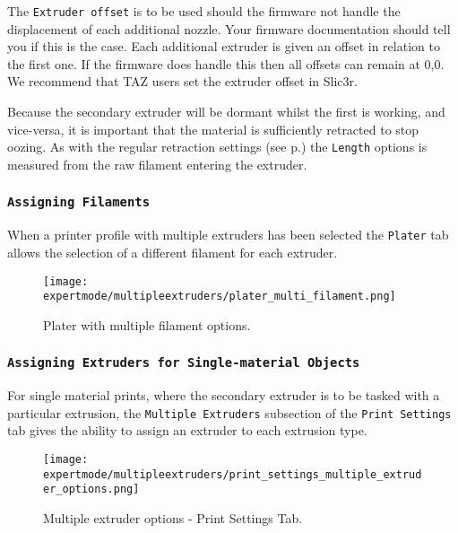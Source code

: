 
The \texttt{Extruder offset} is to be used should the firmware not handle the displacement of each additional nozzle.  Your firmware documentation should tell you if this is the case.  Each additional extruder is given an offset in relation to the first one.  If the firmware does handle this then all offsets can remain at 0,0. We recommend that TAZ users set the extruder offset in Slic3r.

Because the secondary extruder will be dormant whilst the first is working, and vice-versa, it is important that the material is sufficiently retracted to stop oozing.  As with the regular retraction settings (see p.\pageref{fig:retraction_settings}) the \texttt{Length} options is measured from the raw filament entering the extruder.


\subsubsection{\texttt{Assigning Filaments}} %
\label{sub:assigning_filaments}
When a printer profile with multiple extruders has been selected the \texttt{Plater} tab allows the selection of a different filament for each extruder.

\begin{figure}[H]
\centering
\texttt{[image: expertmode/multipleextruders/plater\_multi\_filament.png]}
\caption{Plater with multiple filament options.}
\label{fig:plater_multi_filament}
\end{figure}


\subsubsection{\texttt{Assigning Extruders for Single-material Objects}} %
\label{sub:assigning_extruders}

For single material prints, where the secondary extruder is to be tasked with a particular extrusion, the \texttt{Multiple Extruders} subsection of the \texttt{Print Settings} tab gives the ability to assign an extruder to each extrusion type.

\begin{figure}[H]
\centering
\texttt{[image: expertmode/multipleextruders/print\_settings\_multiple\_extruder\_options.png]}
\caption{Multiple extruder options - Print Settings Tab.}
\label{fig:advanced_multiple_extruder_options}
\end{figure}


